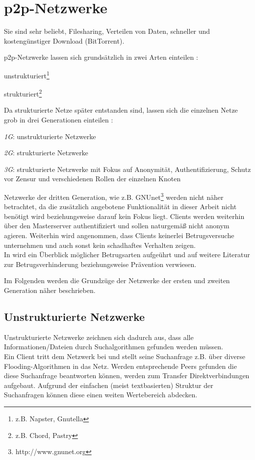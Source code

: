 \section{p2p-Netzwerke}
\label{chap:grundlagen:p2p}
Sie sind sehr beliebt, Filesharing, Verteilen von Daten, schneller und kostengünstiger Download (BitTorrent).

p2p-Netzwerke lassen sich grundsätzlich in zwei Arten einteilen \cite{Steinmetz2005, Lua2005Survey}: 
\begin{itemize*}
\item unstrukturiert\footnote{z.B. Napster, Gnutella}
\item strukturiert\footnote{z.B. Chord, Pastry}
\end{itemize*}

Da strukturierte Netze später entstanden sind, lassen sich die einzelnen Netze grob in drei Generationen einteilen \cite{Bo2003PeertoPeer}:
\begin{itemize*}
	\item \emph{1G}: unstrukturierte Netzwerke
	\item \emph{2G}: strukturierte Netzwerke
	\item \emph{3G}: strukturierte Netzwerke mit Fokus auf Anonymität, Authentifizierung, Schutz vor Zensur und verschiedenen Rollen der einzelnen Knoten
\end{itemize*}

Netzwerke der dritten Generation, wie z.B. GNUnet\footnote{http://www.gnunet.org} \cite{Grothoff2002GNET} werden nicht näher betrachtet, da die zusätzlich angebotene Funktionalität in dieser Arbeit nicht benötigt wird beziehungsweise darauf kein Fokus liegt. Clients werden weiterhin über den Masterserver authentifiziert und sollen naturgemäß nicht anonym agieren. Weiterhin wird angenommen, dass Clients keinerlei Betrugsversuche unternehmen und auch sonst kein schadhaftes Verhalten zeigen.\\
In  wird ein Überblick möglicher Betrugsarten aufgeührt und auf weitere Literatur zur Betrugsverhinderung beziehungsweise Prävention verwiesen.

Im Folgenden werden die Grundzüge der Netzwerke der ersten und zweiten Generation näher beschrieben.

\subsection{Unstrukturierte Netzwerke}
Unstrukturierte Netzwerke zeichnen sich dadurch aus, dass alle Informationen/Dateien durch Suchalgorithmen \cite{Lv2002} gefunden werden müssen. \\
Ein Client tritt dem Netzwerk bei und stellt seine Suchanfrage z.B. über diverse Flooding-Algorithmen in das Netz. Werden entsprechende Peers gefunden die diese Suchanfrage beantworten können, werden zum Transfer Direktverbindungen aufgebaut. Aufgrund der einfachen (meist textbasierten) Struktur der Suchanfragen können diese einen weiten Wertebereich abdecken.

